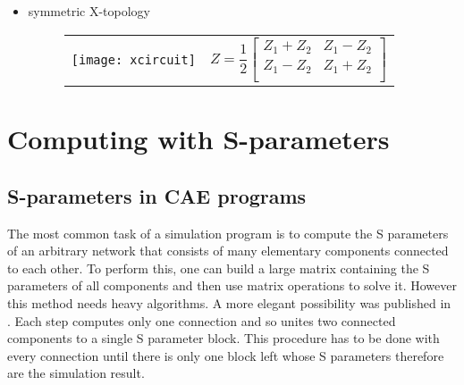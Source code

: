 \begin{itemize}
\item symmetric X-topology

\begin{figure}[ht]
\begin{tabular}{cc}
\begin{minipage}[t]{0.4\linewidth}
\centering
\texttt{[image: xcircuit]}
\end{minipage}
&
\begin{minipage}[t]{0.5\linewidth}
$
Z = \dfrac{1}{2}
\begin{bmatrix}
Z_1 + Z_2 & Z_1 - Z_2\\
Z_1 - Z_2 & Z_1 + Z_2\\
\end{bmatrix}
$
\end{minipage}
\end{tabular}
\end{figure}
\FloatBarrier

\end{itemize}

\section{Computing with S-parameters}

\subsection{S-parameters in CAE programs}
\label{sec:SparameterCAE}

The most common task of a simulation program is to compute the S
parameters of an arbitrary network that consists of many elementary
components connected to each other.  To perform this, one can build a
large matrix containing the S parameters of all components and then
use matrix operations to solve it.  However this method needs heavy
algorithms.  A more elegant possibility was published in
\cite{Compton}. Each step computes only one connection and so unites
two connected components to a single S parameter block.  This
procedure has to be done with every connection until there is only one
block left whose S parameters therefore are the simulation result.

\addvspace{12pt}

